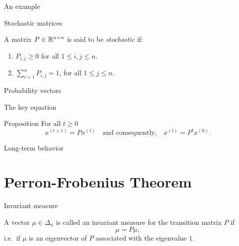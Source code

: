 \documentclass{beamer}
\begin{document}
\begin{frame}[t]{An example}
	\grid

\end{frame}

\begin{frame}[t]{Stochastic matrices}
	\grid

	\begin{definition}
		A matrix $P \in \mathbb{R}^{n \times n}$ is said to be \emph{stochastic} if:
		\begin{enumerate}
			\item $P_{i,j} \geq 0$ for all $1 \leq i,j \leq n$.
			\item $\sum\limits_{i=1}^n P_{i,j} = 1$, for all $1 \leq j \leq n$.
		\end{enumerate}
	\end{definition}
\end{frame}
\begin{frame}[t]{Probability vectors}
	\grid

\end{frame}

\begin{frame}[t]{The key equation}
	\grid

	\vspace{-0.4cm}
	\begin{block}{Proposition}
		For all $t \geq 0$
		$$
		x^{(t+1)} = P x^{(t)}
		\quad \text{and consequently,} \quad
		x^{(t)} =  P^t x^{(0)}.
		$$
	\end{block}

\end{frame}

\begin{frame}[t]{Long-term behavior}
	\grid


\end{frame}

\section{Perron-Frobenius Theorem}

\begin{frame}[t]{Invariant measure}
	\grid

	\vspace{0.2cm}
	\begin{definition}
		A vector $\mu \in \Delta_n$ is called an invariant measure for the transition matrix $P$ if 
		$$
		\mu = P \mu,
		$$
		i.e.\ if $\mu$ is an eigenvector of $P$ associated with the eigenvalue $1$.
	\end{definition}


\end{frame}
\end{document}
